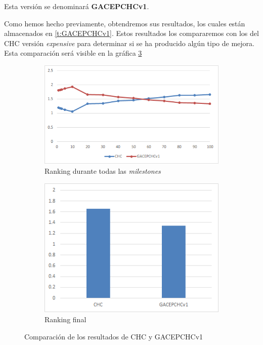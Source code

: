 Esta versión se denominará \textbf{GACEPCHCv1}.

Como hemos hecho previamente, obtendremos sus resultados, los cuales están almacenados en \ref{t:GACEPCHCv1}. 
Estos resultados los compararemos con los del CHC versión \textit{expensive} para determinar si se ha producido algún tipo de mejora. 
Esta comparación será visible en la gráfica \ref{fig:CHCvsGACEPCHCv1}

\begin{figure}[h]
     \centering
     \begin{subfigure}[b]{0.45\textwidth}
         \centering
         \includegraphics[width=\textwidth]{imagenes/Experimental/CHCvsGACEPCHCv1.png}
         \caption{Ranking durante todas las \textit{milestones}}
         \label{fig:CHCvsGACEPCHCv1_lineas}
     \end{subfigure}
     \hfill
     \begin{subfigure}[b]{0.45\textwidth}
         \centering
         \includegraphics[width=\textwidth]{imagenes/Experimental/barras/CHCvsGACEPCHCv1.png}
         \caption{Ranking final}
         \label{fig:CHCvsGACEPCHCv1_barras}
     \end{subfigure}
        \caption{Comparación de los resultados de CHC y GACEPCHCv1}
        \label{fig:CHCvsGACEPCHCv1}
\end{figure}

